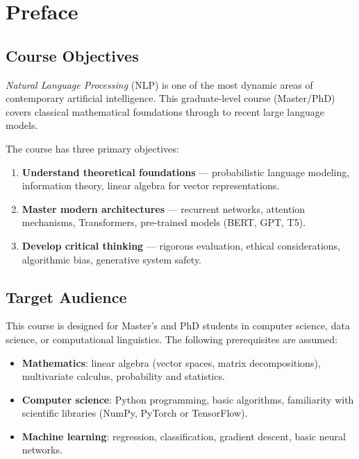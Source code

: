 \chapter*{Preface}

\section*{Course Objectives}

\emph{Natural Language Processing} (NLP) is one of the most dynamic areas of
contemporary artificial intelligence. This graduate-level course (Master/PhD)
covers classical mathematical foundations
through to recent large language models.

The course has three primary objectives:
\begin{enumerate}
    \item \textbf{Understand theoretical foundations} --- probabilistic language
          modeling, information theory, linear algebra for vector
          representations.
    \item \textbf{Master modern architectures} --- recurrent networks, attention
          mechanisms, Transformers, pre-trained models (BERT, GPT, T5).
    \item \textbf{Develop critical thinking} --- rigorous evaluation, ethical
          considerations, algorithmic bias, generative system safety.
\end{enumerate}

\section*{Target Audience}

This course is designed for Master's and PhD students in computer science,
data science, or computational linguistics. The following prerequisites are
assumed:

\begin{itemize}
    \item \textbf{Mathematics}: linear algebra (vector spaces, matrix
          decompositions), multivariate calculus, probability and statistics.
    \item \textbf{Computer science}: Python programming, basic algorithms,
          familiarity with scientific libraries (NumPy, PyTorch or TensorFlow).
    \item \textbf{Machine learning}: regression, classification, gradient
          descent, basic neural networks.
\end{itemize}

